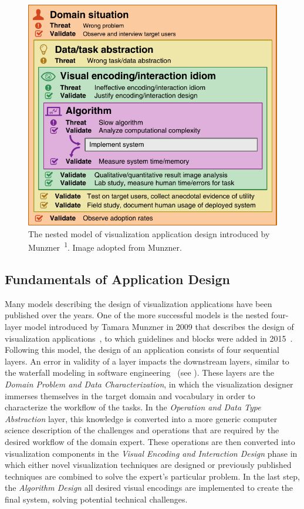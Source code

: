 \begin{figure}
  \centering
  \includegraphics[width=\abfboximagewidth]{figures/intro/design_model.pdf}
  \caption{The nested model of visualization application design introduced by Munzner~\cite{munzner2009nested}\textsuperscript{1}.  Image adopted from Munzner.}
  \label{fig:intro:appl:nested}
\end{figure}


\subsection{Fundamentals of Application Design} \label{cha:intro:appl:design}
Many models describing the design of visualization applications have been published over the years.  One of the more successful models is the nested four-layer model introduced by Tamara Munzner in 2009 that describes the design of visualization applications~\cite{munzner2009nested}, to which guidelines and blocks were added in 2015~\cite{meyer15nested}.  Following this model, the design of an application consists of four sequential layers.  An error in validity of a layer impacts the downstream layers, similar to the waterfall modeling in software engineering~\cite{royce1987managing} (see ).  These layers are the \emph{Domain Problem and Data Characterization}, in which the visualization designer immerses themselves in the target domain and vocabulary in order to characterize the workflow of the tasks.  In the \emph{Operation and Data Type Abstraction} layer, this knowledge is converted into a more generic computer science description of the challenges and operations that are required by the desired workflow of the domain expert.  These operations are then converted into visualization components in the \emph{Visual Encoding and Interaction Design} phase in which either novel visualization techniques are designed or previously published techniques are combined to solve the expert's particular problem.  In the last step, the \emph{Algorithm Design} all desired visual encodings are implemented to create the final system, solving potential technical challenges.

